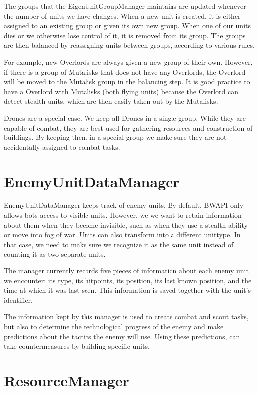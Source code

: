 The groups that the EigenUnitGroupManager maintains are updated whenever the number of units we have changes. When a new unit is created, it is either assigned to an existing group or given its own new group. When one of our units dies or we otherwise lose control of it, it is removed from its group. The groups are then balanced by reassigning units between groups, according to various rules.

For example, new Overlords are always given a new group of their own. However, if there is a group of Mutalisks that does not have any Overlords, the Overlord will be moved to the Mutalisk group in the balancing step. It is good practice to have a Overlord with Mutalisks (both flying units) because the Overlord can detect stealth units, which are then easily taken out by the Mutalisks.

Drones are a special case. We keep all Drones in a single group. While they are capable of combat, they are best used for gathering resources and construction of buildings. By keeping them in a special group we make sure they are not accidentally assigned to combat tasks.

\section{EnemyUnitDataManager}

EnemyUnitDataManager keeps track of enemy units. By default, BWAPI only allows bots access to visible units. However, we we want to retain information about them when they become invisible, such as when they use a stealth ability or move into fog of war. Units can also transform into a different unittype. In that case, we need to make sure we recognize it as the same unit instead of counting it as two separate units.

The manager currently records five pieces of information about each enemy unit we encounter: its type, its hitpoints, its position, its last known position, and the time at which it was last seen. This information is saved together with the unit's identifier.

The information kept by this manager is used to create combat and scout tasks, but also to determine the technological progress of the enemy and make predictions about the tactics the enemy will use. Using these predictions, \massexpand{} can take countermeasures by building specific units.

\section{ResourceManager}

